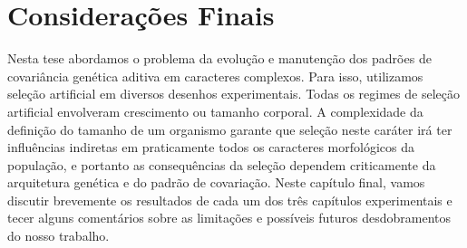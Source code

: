 \pagestyle{empty}
\cleardoublepage
\pagestyle{fancy}


\chapter{Considerações Finais}

\begin{refsection}

Nesta tese abordamos o problema da evolução e manutenção dos padrões de
covariância genética aditiva em caracteres complexos. Para isso, utilizamos
seleção artificial em diversos desenhos experimentais. Todas os regimes de
seleção artificial envolveram crescimento ou tamanho corporal. A complexidade
da definição do tamanho de um organismo garante que seleção neste caráter irá
ter influências indiretas em praticamente todos os caracteres morfológicos da
população, e portanto as consequências da seleção dependem criticamente da
arquitetura genética e do padrão de covariação. Neste capítulo final, vamos
discutir brevemente os resultados de cada um dos três capítulos experimentais
e tecer alguns comentários sobre as limitações e possíveis futuros
desdobramentos do nosso trabalho.


\end{refsection}
